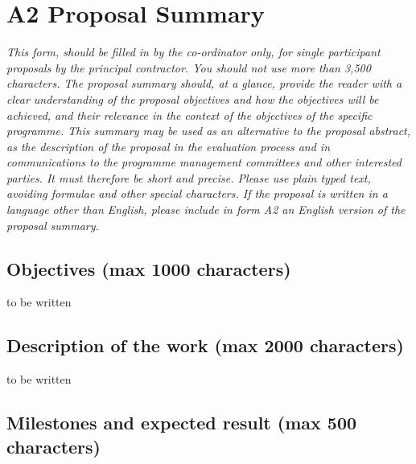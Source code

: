 \documentclass[a4paper,11pt]{report}
\begin{document}
\section*{A2 Proposal Summary}
\textit{This form, should be filled in by the co-ordinator only, for single
participant proposals by the principal contractor. You should not use more than
3,500 characters. The proposal summary should, at a glance, provide the reader
with a clear understanding of the proposal objectives and how the objectives
will be achieved, and their relevance in the context of the objectives of the
specific programme. This summary may be used as an alternative to the proposal
abstract, as the description of the proposal in the evaluation process and in
communications to the programme management committees and other interested
parties. It must therefore be short and precise. Please use plain typed text,
avoiding formulae and other special characters. If the proposal is written in a
language other than English, please include in form A2 an English version of
the proposal summary.}
\subsection*{Objectives (max 1000 characters)}
to be written
\subsection*{Description of the work (max 2000 characters)}
to be written
\subsection*{Milestones and expected result (max 500 characters)}
\end{document}
